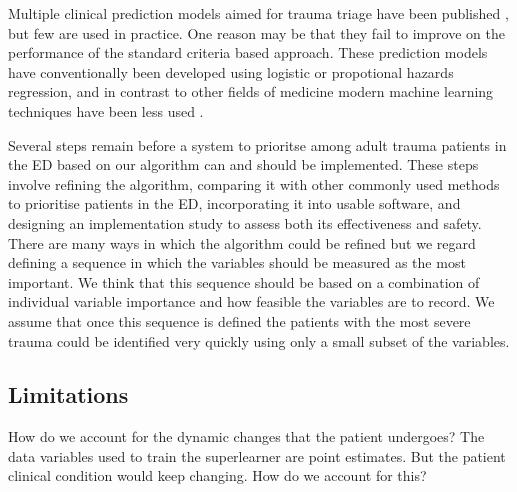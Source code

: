 \documentclass[10pt,letterpaper]{article}\usepackage[]{graphicx}\usepackage[]{color}
\begin{document}
Multiple clinical prediction models aimed for trauma triage have been published
\cite{Rehn2011}, but few are used in practice. One reason may be that they fail
to improve on the performance of the standard criteria based approach. These
prediction models have conventionally been developed using logistic or
propotional hazards regression, and in contrast to other fields of medicine
modern machine learning techniques have been less used \cite{Liu2017}. 


Several steps remain before a system to prioritse among adult trauma patients in
the ED based on our algorithm can and should be implemented. These steps involve
refining the algorithm, comparing it with other commonly used methods to
prioritise patients in the ED, incorporating it into usable software, and
designing an implementation study to assess both its effectiveness and
safety. There are many ways in which the algorithm could be refined but we
regard defining a sequence in which the variables should be measured as the most
important. We think that this sequence should be based on a combination of
individual variable importance and how feasible the variables are to record. We
assume that once this sequence is defined the patients with the most severe
trauma could be identified very quickly using only a small subset of the
variables.



\subsection*{Limitations}
How do we account for the dynamic changes that the patient undergoes? The data
variables used to train the superlearner are point estimates. But the patient
clinical condition would keep changing. How do we account for this?
\end{document}
